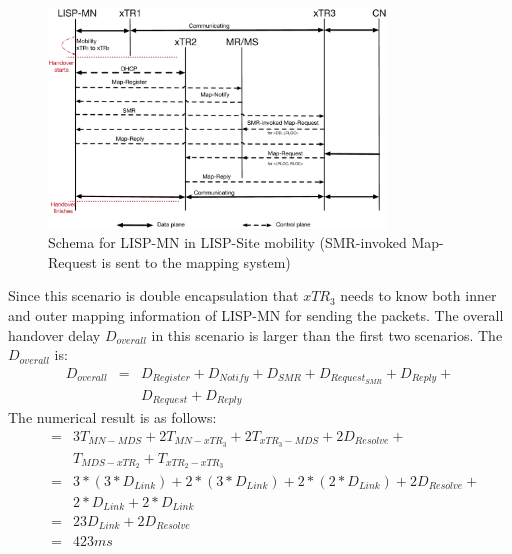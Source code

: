 \begin{figure}[!t]
	\centering
	\includegraphics[width=0.8\textwidth]{Pics/Mobility_double_encap_schema_SMR_askMDS_simplify}
	\caption{Schema for LISP-MN in LISP-Site mobility (SMR-invoked Map-Request is sent to the mapping system)}
	\label{Mobility_double_encap_schema_SMR_askMDS_simplify}
\end{figure}

Since this scenario is double encapsulation that $xTR_3$ needs to know both inner and outer mapping information of LISP-MN for sending the packets. The overall handover delay $D_{overall}$ in this scenario is larger than the first two scenarios. The $D_{overall}$ is:
\begin{eqnarray}
D_{overall} &=& D_{Register} + D_{Notify} + D_{SMR} + D_{Request_{SMR}} + D_{Reply} +  \nonumber \\
& & D_{Request}+ D_{Reply} 
\end{eqnarray}
The numerical result is as follows:
\begin{eqnarray}
&=& 3T_{MN-MDS} + 2T_{MN-xTR_3} + 2T_{xTR_3-MDS} + 2D_{Resolve} +   \nonumber \\
& & T_{MDS-xTR_2} + T_{xTR_2-xTR_3}   \nonumber \\
&=& 3* (3*D_{Link}) + 2*(3*D_{Link}) + 2*(2*D_{Link}) + 2D_{Resolve} +  \nonumber \\
& & 2*D_{Link} + 2*D_{Link} \nonumber \\
&=& 23D_{Link} + 2D_{Resolve}   \nonumber \\
&=& 423 ms \nonumber
\end{eqnarray}

